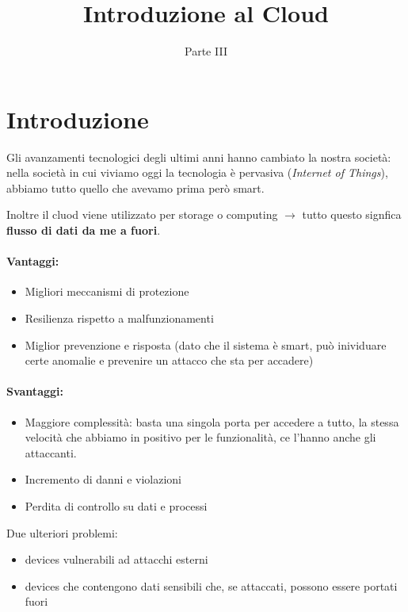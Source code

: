 \documentclass{report}
\title{Introduzione al Cloud}
\date{Parte III}
\begin{document}
\maketitle

\tableofcontents
\newpage

\chapter{Introduzione}
Gli avanzamenti tecnologici degli ultimi anni hanno cambiato 
la nostra società: nella società in cui viviamo oggi la tecnologia è 
pervasiva (\textit{Internet of Things}), abbiamo tutto quello che avevamo
prima però smart.

\noindent Inoltre il cluod viene utilizzato per storage o computing $ \rightarrow $ tutto questo
signfica \textbf{flusso di dati da me a fuori}.

\subsubsection{Vantaggi:}
\begin{itemize}
    \item Migliori meccanismi di protezione
    \item Resilienza rispetto a malfunzionamenti
    \item Miglior prevenzione e risposta (dato che il sistema è smart, può inividuare certe anomalie e prevenire 
    un attacco che sta per accadere)
\end{itemize}

\subsubsection{Svantaggi:}
\begin{itemize}
    \item Maggiore complessità: basta una singola porta per accedere a tutto,
    la stessa velocità che abbiamo in positivo per le funzionalità, ce l'hanno anche gli attaccanti.
    \item Incremento di danni e violazioni
    \item Perdita di controllo su dati e processi
\end{itemize}

Due ulteriori problemi:
\begin{itemize}
    \item devices vulnerabili ad attacchi esterni
    \item devices che contengono dati sensibili che, se attaccati, possono essere portati fuori
\end{itemize}
\end{document}
